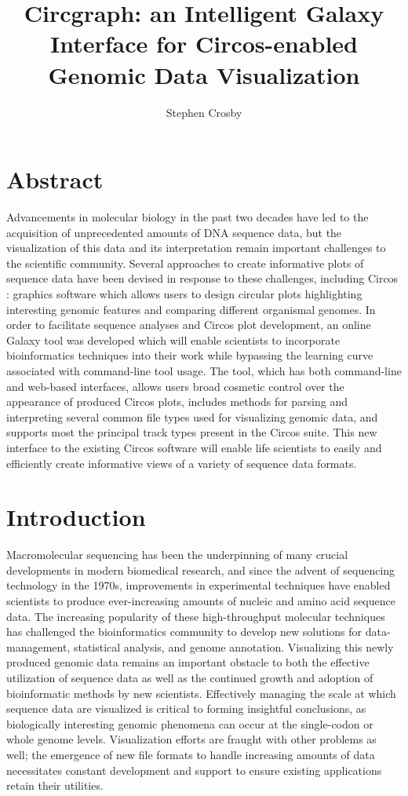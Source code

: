 \documentclass[twocolumn]{article}
\title{Circgraph: an Intelligent Galaxy Interface for Circos-enabled Genomic Data Visualization}
\author{Stephen Crosby}
\begin{document}
\maketitle
\section*{Abstract}
Advancements in molecular biology in the past two decades have led to the acquisition of
unprecedented amounts of DNA sequence data, but the visualization of this data and its
interpretation remain important challenges to the scientific community. Several approaches to
create informative plots of sequence data have been devised in response to these challenges, 
including Circos \cite{circospaper}: graphics software which allows users to design circular plots highlighting
interesting genomic features and comparing different organismal genomes. In order to facilitate sequence analyses and Circos plot development, an online Galaxy \cite{galaxypaper} tool was developed which
will enable scientists to incorporate bioinformatics techniques into their work while bypassing the learning curve associated with command-line tool usage. The tool, which has both command-line and web-based interfaces, allows users broad cosmetic control over the appearance of produced Circos plots, includes methods for parsing and interpreting several common file types used for visualizing genomic data, and supports most the principal track types present in the Circos suite. This new interface to the existing Circos software will enable life scientists to easily and efficiently create informative views of a variety of sequence data formats.

\section*{Introduction}
Macromolecular sequencing has been the underpinning of many crucial developments in modern biomedical research, and since the advent of sequencing technology in the 1970s, improvements in experimental techniques have enabled scientists to produce ever-increasing amounts of nucleic and amino acid sequence data. The increasing popularity of these high-throughput molecular techniques has challenged the bioinformatics community to develop new solutions for data-management, statistical analysis, and genome annotation.\cite{challenge} Visualizing this newly produced genomic data remains an important obstacle to both the effective utilization of sequence data as well as the continued growth and adoption of bioinformatic methods by new scientists.\cite{challenge} Effectively managing the scale at which sequence data are visualized is critical to forming insightful conclusions, as biologically interesting genomic phenomena can occur at the single-codon or whole genome levels.\cite{challenge} Visualization efforts are fraught with other problems as well; the emergence of new file formats to handle increasing amounts of data necessitates constant development and support to ensure existing applications retain their utilities.\cite{challenge}
\end{document}

